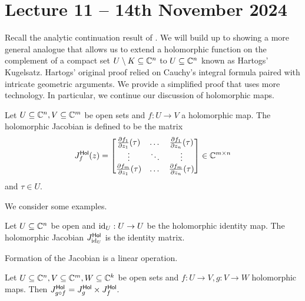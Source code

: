 \section{Lecture 11 -- 14th November 2024}\label{sec: lecture 11}
Recall the analytic continuation result of . We will build up to showing a more general analogue that allows us to extend a holomorphic function on the complement of a compact set $U\setminus K\subseteq\mathbb{C}^{n}$ to $U\subseteq\mathbb{C}^{n}$ known as Hartogs' Kugelsatz. Hartogs' original proof relied on Cauchy's integral formula paired with intricate geometric arguments. We provide a simplified proof that uses more technology. In particular, we continue our discussion of holomorphic maps. 

\begin{definition}\label{def: holomorphic Jacobian}
    Let $U\subseteq\mathbb{C}^{n},V\subseteq\mathbb{C}^{m}$ be open sets and $f:U\to V$ a holomorphic map. The holomorphic Jacobian is defined to be the matrix 
    $$J^{\mathsf{Hol}}_{f}(z)=\begin{bmatrix}
        \frac{\partial f_{1}}{\partial z_{1}}(\tau) & \dots & \frac{\partial f_{1}}{\partial z_{n}}(\tau) \\
        \vdots & \ddots & \vdots \\
        \frac{\partial f_{m}}{\partial z_{1}}(\tau) & \dots & \frac{\partial f_{m}}{\partial z_{n}}(\tau)
    \end{bmatrix}\in\mathbb{C}^{m\times n}$$
    and $\tau\in U$. 
\end{definition}
We consider some examples. 
\begin{example}
    Let $U\subseteq\mathbb{C}^{n}$ be open and $\mathrm{id}_{U}:U\to U$ be the holomorphic identity map. The holomorphic Jacobian $J^{\mathsf{Hol}}_{\mathrm{id}_{U}}$ is the identity matrix.  
\end{example}
Formation of the Jacobian is a linear operation. 
\begin{proposition}\label{prop: jacobian of composite is product}
    Let $U\subseteq\mathbb{C}^{n},V\subseteq\mathbb{C}^{m},W\subseteq\mathbb{C}^{k}$ be open sets and $f:U\to V,g:V\to W$ holomorphic maps. Then $J^{\mathsf{Hol}}_{g\circ f}=J^{\mathsf{Hol}}_{g}\times J^{\mathsf{Hol}}_{f}$. 
\end{proposition}
